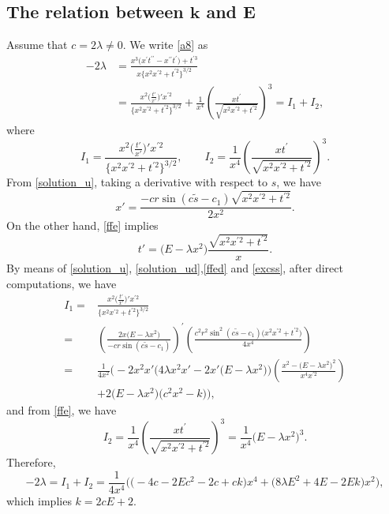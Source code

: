 \documentclass[pdftex]{sigma}
\numberwithin{equation}{section}
\begin{document}
\subsection[The relation between k and E]{The relation between $\boldsymbol{k}$ and $\boldsymbol{E}$}
Assume that $c=2\lambda\neq 0$. We write \eqref{a8} as
\begin{align}
-2\lambda&=\frac{x^{3}\bigl(x^{\prime }t^{\prime \prime }-x^{\prime \prime
}t^{\prime }\bigr)+t^{\prime 3}}{x\big\{x^2x^{\prime 2}+t^{\prime 2}\big\}^{3/2}}\nonumber\\
&=\frac{x^{2}\bigl(\frac{t'}{x'}\bigr)'x^{\prime 2}}{\big\{x^2x^{\prime 2}+t^{\prime 2}\big\}^{3/2}}+\frac{1}{x^4}\left(\frac{xt^{\prime}}{\sqrt{x^{2}x^{\prime 2}+t^{\prime 2}}}\right)^3=I_1+I_2,\label{pmce}
\end{align}
where \[I_1=\frac{x^{2}\bigl(\frac{t'}{x'}\bigr)'x^{\prime 2}}{\big\{x^2x^{\prime 2}+t^{\prime 2}\big\}^{3/2}},\qquad I_2=\frac{1}{x^4}\left(\frac{xt^{\prime}}{\sqrt{x^{2}x^{\prime 2}+t^{\prime 2}}}\right)^3.\]
From \eqref{solution_u}, taking a derivative with respect to $s$, we have
\begin{equation}\label{solution_ud}
x'=\frac{-cr\sin{(c\tilde{s}-c_1)}\sqrt{x^2x^{\prime 2}+t^{\prime 2}}}{2x^2}.
\end{equation}
On the other hand, \eqref{ffe} implies
\begin{equation}\label{ffed}
t'=\bigl(E-\lambda x^2\bigr)\frac{\sqrt{x^2x^{\prime 2}+t^{\prime 2}}}{x}.
\end{equation}
By means of \eqref{solution_u}, \eqref{solution_ud},\eqref{ffed} and \eqref{excss}, after direct computations, we have
\begin{align*}
I_1={}&\frac{x^{2}\bigl(\frac{t'}{x'}\bigr)'x^{\prime 2}}{\big\{x^2x^{\prime 2}+t^{\prime 2}\big\}^{3/2}}\\
={}&\left(\frac{2x\bigl(E-\lambda x^2\bigr)}{-cr\sin{(c\tilde{s}-c_1)}}\right)^{\prime}\left(\frac{c^{2}r^{2}\sin^{2}{(c\tilde{s}-c_1)}\bigl(x^2x^{\prime 2}+t^{\prime 2}\bigr)}{4x^4}\right)\\
={}&\frac{1}{4x^2}\Biggl(-2x^{2}x'\bigl(4\lambda x^{2}x'-2x'\bigl(E-\lambda x^{2}\bigr)\bigr)\left(\frac{x^{2}-\bigl(E-\lambda x^{2}\bigr)^{2}}{x^{4}x^{\prime 2}}\right) \\
& +2\bigl(E-\lambda x^{2}\bigr)\bigl(c^{2}x^{2}-k\bigr)\Biggr),
\end{align*}
and from \eqref{ffe}, we have
\begin{equation*}
I_2=\frac{1}{x^4}\left(\frac{xt^{\prime}}{\sqrt{x^{2}x^{\prime 2}+t^{\prime 2}}}\right)^3=\frac{1}{x^{4}}\bigl(E-\lambda x^{2}\bigr)^3.
\end{equation*}
Therefore,
\[
-2\lambda=I_1+I_2=\frac{1}{4x^4}\bigl(\bigl(-4c-2Ec^{2}-2c+ck\bigr)x^4+\bigl(8\lambda E^{2}+4E-2Ek\bigr)x^2\bigr),
\]
which implies
$
k=2cE+2$.
\end{document}
